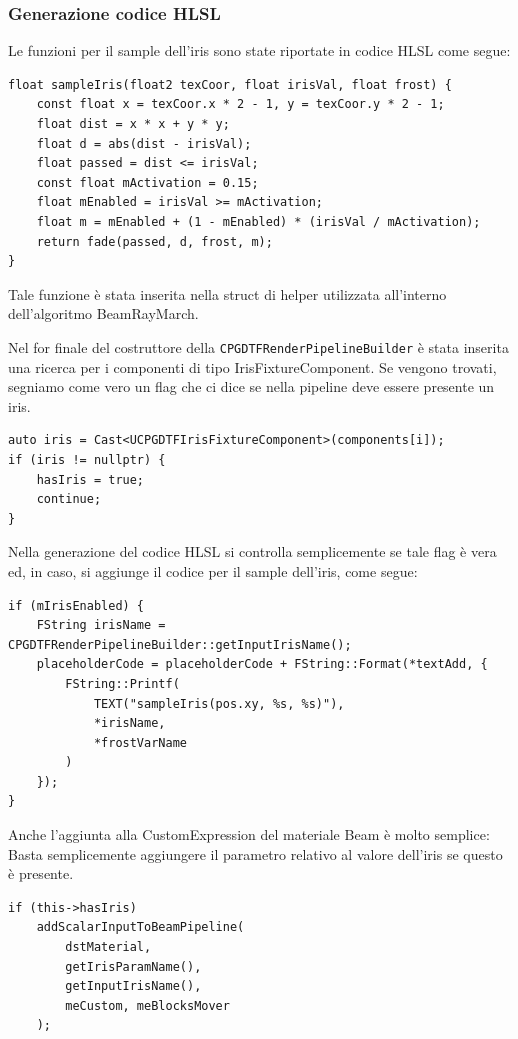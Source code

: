 \documentclass[main.tex]{subfiles}
\begin{document}
\subsubsection{Generazione codice HLSL}\label{subsec:5_2_IrisHlsl}
Le funzioni per il sample dell'iris sono state riportate in codice HLSL come segue:
\lstset{language=glsl}
\begin{lstlisting}
float sampleIris(float2 texCoor, float irisVal, float frost) {
    const float x = texCoor.x * 2 - 1, y = texCoor.y * 2 - 1;
    float dist = x * x + y * y;
    float d = abs(dist - irisVal);
    float passed = dist <= irisVal;
    const float mActivation = 0.15;
    float mEnabled = irisVal >= mActivation;
    float m = mEnabled + (1 - mEnabled) * (irisVal / mActivation);
    return fade(passed, d, frost, m);
}
\end{lstlisting}
Tale funzione è stata inserita nella struct di helper utilizzata all'interno dell'algoritmo BeamRayMarch. \newline

Nel for finale del costruttore della \lstinline{CPGDTFRenderPipelineBuilder} è stata inserita una ricerca per i componenti di tipo IrisFixtureComponent. Se vengono trovati, segniamo come vero un flag che ci dice se nella pipeline deve essere presente un iris.
\lstset{language=UEcpp}
\begin{lstlisting}
auto iris = Cast<UCPGDTFIrisFixtureComponent>(components[i]);
if (iris != nullptr) {
    hasIris = true;
    continue;
}
\end{lstlisting}

Nella generazione del codice HLSL si controlla semplicemente se tale flag è vera ed, in caso, si aggiunge il codice per il sample dell'iris, come segue:
\begin{lstlisting}
if (mIrisEnabled) {
    FString irisName = CPGDTFRenderPipelineBuilder::getInputIrisName();
    placeholderCode = placeholderCode + FString::Format(*textAdd, {
        FString::Printf(
            TEXT("sampleIris(pos.xy, %s, %s)"),
            *irisName,
            *frostVarName
        )
    });
}
\end{lstlisting}

Anche l'aggiunta alla CustomExpression del materiale Beam è molto semplice: Basta semplicemente aggiungere il parametro relativo al valore dell'iris se questo è presente.
\begin{lstlisting}
if (this->hasIris)
    addScalarInputToBeamPipeline(
        dstMaterial,
        getIrisParamName(),
        getInputIrisName(),
        meCustom, meBlocksMover
    );
\end{lstlisting}
\end{document}
